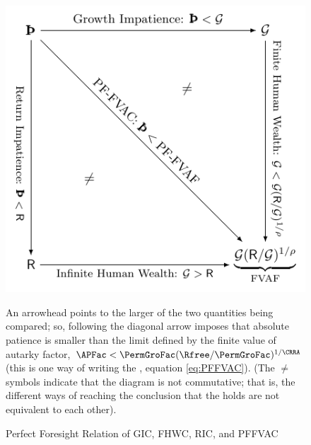 \begin{figure}[ht]
  \centerline{
    \includegraphics[width=5in]{Figures/RelatePFGICFHWCRICPFFVAC}
  }
  \caption{Perfect Foresight Relation of {GIC}, {FHWC}, {RIC}, and {PFFVAC}}
  \label{fig:RelatePFGICFHWCRICPFFVAC}
  \footnotesize{An arrowhead points to the larger of the two quantities being compared; so, following the diagonal arrow imposes that absolute patience is smaller than the limit defined by the finite value of autarky factor, $\APFac < \PermGroFac (\Rfree/\PermGroFac)^{1/\CRRA}$ (this is one way of writing the {\PFFVAC}, equation \eqref{eq:PFFVAC}}). (The $\neq$ symbols indicate that the diagram is not commutative; that is, the different ways of reaching the conclusion that the {\PFFVAC} holds are not equivalent to each other).
\end{figure}
